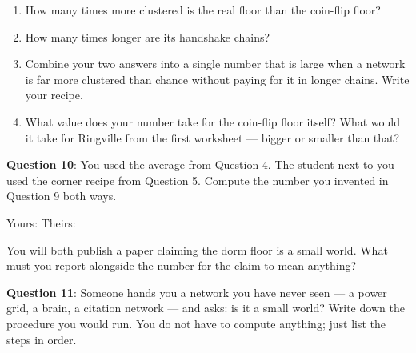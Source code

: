 \documentclass[a4paper, 14pt]{extarticle}
\begin{document}
\begin{enumerate}
    \item How many times more clustered is the real floor than the coin-flip
          floor? \underline{\hspace{2cm}}
    \item How many times longer are its handshake chains?
          \underline{\hspace{2cm}}
    \item Combine your two answers into a single number that is large when a
          network is far more clustered than chance without paying for it in
          longer chains. Write your recipe.

    \underline{\hspace{\textwidth}}

    \item What value does your number take for the coin-flip floor itself?
          \underline{\hspace{2cm}} \quad What would it take for Ringville from
          the first worksheet --- bigger or smaller than that?
          \underline{\hspace{2cm}}
\end{enumerate}

{\bf Question 10}:
You used the average from Question 4. The student next to you used the corner
recipe from Question 5. Compute the number you invented in Question 9 both ways.

Yours: \underline{\hspace{3cm}} \quad Theirs: \underline{\hspace{3cm}}

You will both publish a paper claiming the dorm floor is a small world. What
must you report alongside the number for the claim to mean anything?

\underline{\hspace{\textwidth}}

\vspace{2em}

{\bf Question 11}:
Someone hands you a network you have never seen --- a power grid, a brain, a
citation network --- and asks: is it a small world? Write down the procedure
you would run. You do not have to compute anything; just list the steps in
order.

\vspace{8em}
\end{document}

